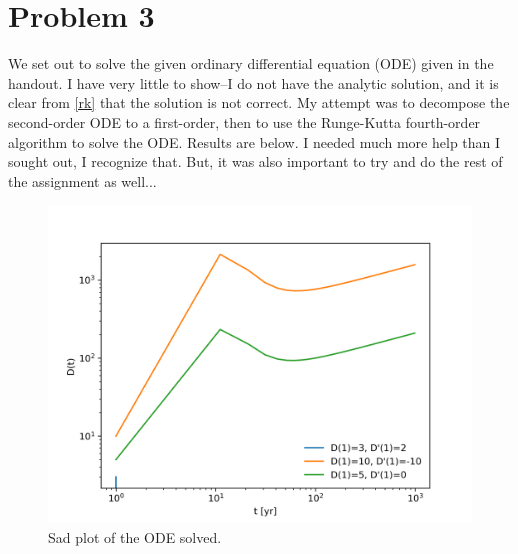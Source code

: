 \section{Problem 3}


We set out to solve the given ordinary differential equation (ODE) given in
the handout. I have very little to show--I do not have the analytic solution,
and it is clear from \autoref{rk} that the solution is not correct. My attempt
was to decompose the second-order ODE to a first-order, then to use the
Runge-Kutta fourth-order algorithm to solve the ODE. Results are below.
I needed much more help than I sought out, I recognize that. But, it was also
important to try and do the rest of the assignment as well...

\begin{figure}[h!]
    \centering
    \includegraphics[width=0.9\linewidth]{./plots/rk4.png}
    \caption{Sad plot of the ODE solved.}
    \label{rk}
\end{figure}

